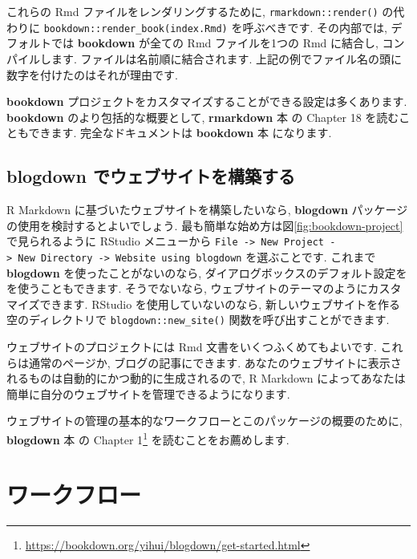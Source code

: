 \documentclass[
  11pt,
]{bxjsreport}
\renewcommand{\href}[2]{#2\footnote{\url{#1}}}
\begin{document}
これらの Rmd ファイルをレンダリングするために, \texttt{rmarkdown::render()} の代わりに \texttt{bookdown::render\_book(\textquotesingle{}index.Rmd\textquotesingle{})} を呼ぶべきです. その内部では, デフォルトでは \textbf{bookdown} が全ての Rmd ファイルを1つの Rmd に結合し, コンパイルします. ファイルは名前順に結合されます. 上記の例でファイル名の頭に数字を付けたのはそれが理由です.

\textbf{bookdown} プロジェクトをカスタマイズすることができる設定は多くあります. \textbf{bookdown} のより包括的な概要として, \textbf{rmarkdown} 本 \autocite{rmarkdown2018} の Chapter 18 を読むこともできます. 完全なドキュメントは \textbf{bookdown} 本 \autocite{bookdown2016} になります.

\hypertarget{blogdown}{%
\section{\texorpdfstring{\textbf{blogdown} でウェブサイトを構築する}{blogdown でウェブサイトを構築する}}\label{blogdown}}

R Markdown に基づいたウェブサイトを構築したいなら, \textbf{blogdown} パッケージ \autocite{R-blogdown} の使用を検討するとよいでしょう. 最も簡単な始め方は図\ref{fig:bookdown-project}で見られるように RStudio メニューから \texttt{File -\textgreater{}\ New\ Project\ -\textgreater{}\ New\ Directory\ -\textgreater{}\ Website\ using\ blogdown} を選ぶことです. これまで \textbf{blogdown} を使ったことがないのなら, ダイアログボックスのデフォルト設定をを使うこともできます. そうでないなら, ウェブサイトのテーマのようにカスタマイズできます. RStudio を使用していないのなら, 新しいウェブサイトを作る空のディレクトリで \texttt{blogdown::new\_site()} 関数を呼び出すことができます.

ウェブサイトのプロジェクトには Rmd 文書をいくつふくめてもよいです. これらは通常のページか, ブログの記事にできます. あなたのウェブサイトに表示されるものは自動的にかつ動的に生成されるので, R Markdown によってあなたは簡単に自分のウェブサイトを管理できるようになります.

ウェブサイトの管理の基本的なワークフローとこのパッケージの概要のために, \textbf{blogdown} 本 \autocite{blogdown2017} の \href{https://bookdown.org/yihui/blogdown/get-started.html}{Chapter 1} を読むことをお薦めします.

\hypertarget{workflow}{%
\chapter{ワークフロー}\label{workflow}}
\end{document}

